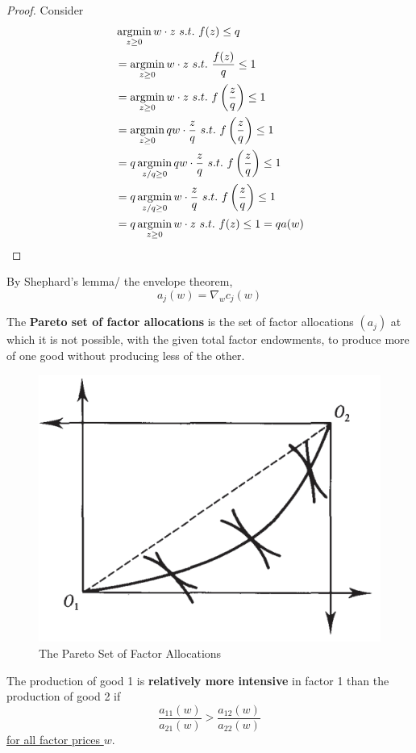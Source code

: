 \documentclass{report}
\begin{document}
			\begin{proof}
				Consider 
				\begin{align}
					&\argmin_{z \geq 0} w \cdot z\ s.t.\ f(z) \leq q \\
					&= \argmin_{z \geq 0} w \cdot z\ s.t.\ \frac{f(z)}{q} \leq 1 \\
					&= \argmin_{z \geq 0} w \cdot z\ s.t.\ f\left(\frac{z}{q}\right) \leq 1 \\
					&= \argmin_{z \geq 0} q w \cdot \frac{z}{q}\ s.t.\ f\left(\frac{z}{q}\right) \leq 1 \\
					&= q \argmin_{z/q \geq 0} q w \cdot \frac{z}{q}\ s.t.\ f\left(\frac{z}{q}\right) \leq 1 \\
					&= q \argmin_{z/q \geq 0} w \cdot \frac{z}{q}\ s.t.\ f\left(\frac{z}{q}\right) \leq 1 \\
					&= q \argmin_{z \geq 0} w \cdot z\ s.t.\ f(z) \leq 1 = q a(w)
				\end{align}
			\end{proof}
			
			\begin{proposition}
				By Shephard's lemma/ the envelope theorem,
				\begin{equation}
					a_j(w) = \nabla_w c_j(w)
				\end{equation}
			\end{proposition}
			
			\begin{definition}
				The \textbf{Pareto set of factor allocations} is the set of factor allocations $(a_j)$ at which it is not possible, with the given total factor endowments, to produce more of one good without producing less of the other.
			\end{definition}
			
			\begin{figure}[h]
				\centering
				\includegraphics[width=0.3\linewidth]{figures/pareto_prod_set}
				\caption{The Pareto Set of Factor Allocations}
			\end{figure}
			
			\begin{definition}
				The production of good 1 is \textbf{relatively more intensive} in factor 1 than the production of good 2 if
				\begin{equation}
					\frac{a_{11}(w)}{a_{21}(w)} > \frac{a_{12}(w)}{a_{22}(w)}
				\end{equation}
				\ul{for all factor prices $w$}.
			\end{definition}
			
\end{document}
